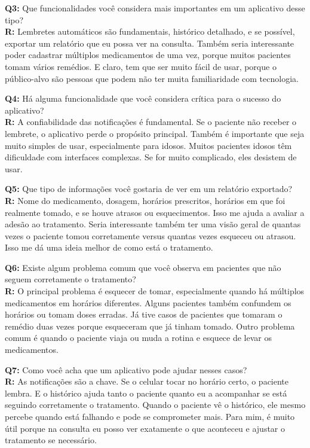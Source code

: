 \documentclass[12pt]{article}
\begin{document}
\textbf{Q3:} Que funcionalidades você considera mais importantes em um aplicativo desse tipo? \\
\textbf{R:} Lembretes automáticos são fundamentais, histórico detalhado, e se possível, exportar um relatório que eu possa ver na consulta. Também seria interessante poder cadastrar múltiplos medicamentos de uma vez, porque muitos pacientes tomam vários remédios. E claro, tem que ser muito fácil de usar, porque o público-alvo são pessoas que podem não ter muita familiaridade com tecnologia.

\textbf{Q4:} Há alguma funcionalidade que você considera crítica para o sucesso do aplicativo? \\
\textbf{R:} A confiabilidade das notificações é fundamental. Se o paciente não receber o lembrete, o aplicativo perde o propósito principal. Também é importante que seja muito simples de usar, especialmente para idosos. Muitos pacientes idosos têm dificuldade com interfaces complexas. Se for muito complicado, eles desistem de usar.

\textbf{Q5:} Que tipo de informações você gostaria de ver em um relatório exportado? \\
\textbf{R:} Nome do medicamento, dosagem, horários prescritos, horários em que foi realmente tomado, e se houve atrasos ou esquecimentos. Isso me ajuda a avaliar a adesão ao tratamento. Seria interessante também ter uma visão geral de quantas vezes o paciente tomou corretamente versus quantas vezes esqueceu ou atrasou. Isso me dá uma ideia melhor de como está o tratamento.

\textbf{Q6:} Existe algum problema comum que você observa em pacientes que não seguem corretamente o tratamento? \\
\textbf{R:} O principal problema é esquecer de tomar, especialmente quando há múltiplos medicamentos em horários diferentes. Alguns pacientes também confundem os horários ou tomam doses erradas. Já tive casos de pacientes que tomaram o remédio duas vezes porque esqueceram que já tinham tomado. Outro problema comum é quando o paciente viaja ou muda a rotina e esquece de levar os medicamentos.

\textbf{Q7:} Como você acha que um aplicativo pode ajudar nesses casos? \\
\textbf{R:} As notificações são a chave. Se o celular tocar no horário certo, o paciente lembra. E o histórico ajuda tanto o paciente quanto eu a acompanhar se está seguindo corretamente o tratamento. Quando o paciente vê o histórico, ele mesmo percebe quando está falhando e pode se comprometer mais. Para mim, é muito útil porque na consulta eu posso ver exatamente o que aconteceu e ajustar o tratamento se necessário.
\end{document}
